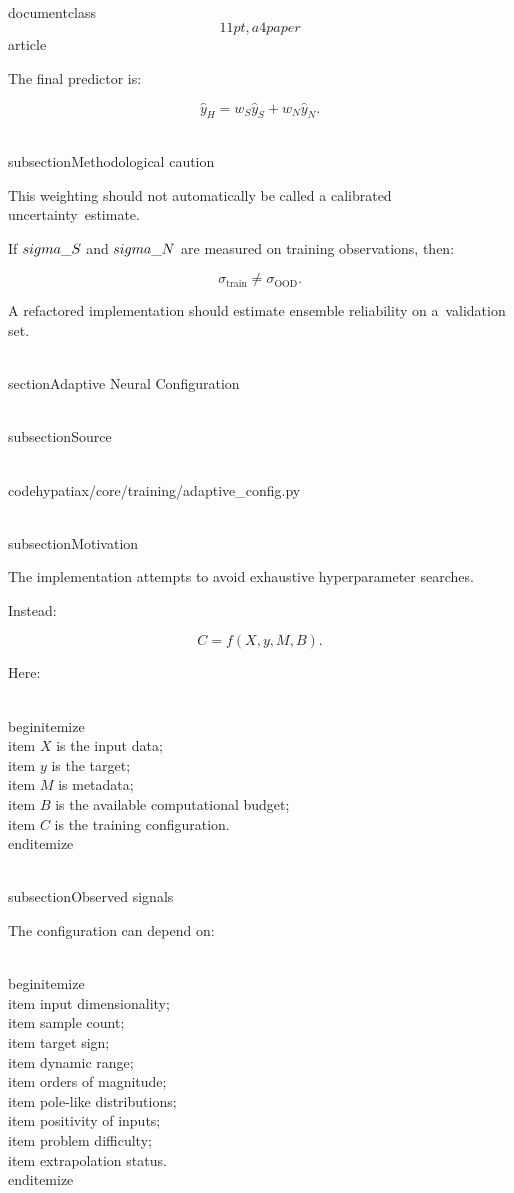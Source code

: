 \\documentclass\[11pt,a4paper\]{article}
\begin{document}
 The final predictor is:

 $$
\hat y_H
=
w_S\hat y_S+w_N\hat y_N.
$$

 \\subsection{Methodological caution}

 This weighting should not automatically be called a calibrated uncertainty\
 estimate.

 If $\\sigma\_S$ and $\\sigma\_N$ are measured on training observations, then:

 $$
\sigma_{\mathrm{train}}
\neq
\sigma_{\mathrm{OOD}}.
$$

 A refactored implementation should estimate ensemble reliability on a\
 validation set.

 \\section{Adaptive Neural Configuration}\

 \\subsection{Source}

 \\code{hypatiax/core/training/adaptive\_config.py}

 \\subsection{Motivation}

 The implementation attempts to avoid exhaustive hyperparameter searches.

 Instead:

 $$
C=f(X,y,M,B).
$$

 Here:

 \\begin{itemize}\
 \\item $X$ is the input data;\
 \\item $y$ is the target;\
 \\item $M$ is metadata;\
 \\item $B$ is the available computational budget;\
 \\item $C$ is the training configuration.\
 \\end{itemize}

 \\subsection{Observed signals}

 The configuration can depend on:

 \\begin{itemize}\
 \\item input dimensionality;\
 \\item sample count;\
 \\item target sign;\
 \\item dynamic range;\
 \\item orders of magnitude;\
 \\item pole-like distributions;\
 \\item positivity of inputs;\
 \\item problem difficulty;\
 \\item extrapolation status.\
 \\end{itemize}
\end{document}
